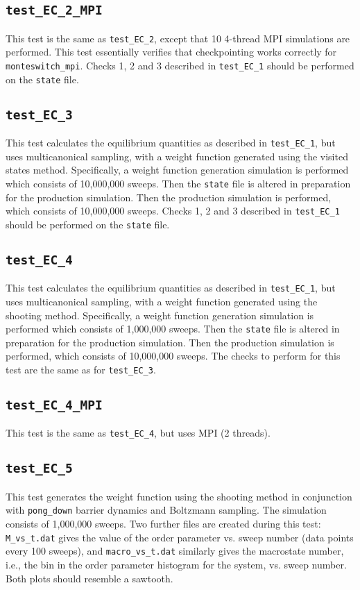 \documentclass{report}
\begin{document}
\subsection{\texttt{test\_EC\_2\_MPI}}
This test is the same as \texttt{test\_EC\_2}, except that 10 4-thread MPI simulations are performed. This test essentially verifies 
that checkpointing works correctly for \texttt{monteswitch\_mpi}. Checks 1, 2 and 3 described in \texttt{test\_EC\_1} should be 
performed on the \texttt{state} file.


\subsection{\texttt{test\_EC\_3}}
This test calculates the equilibrium quantities as described in \texttt{test\_EC\_1}, but uses multicanonical sampling,
with a weight function generated using the visited states method. Specifically, a weight function generation 
simulation is performed which consists of 10,000,000 sweeps. Then the \texttt{state} file is altered in preparation 
for the production simulation. Then the production simulation is performed, which consists of 10,000,000 sweeps.
Checks 1, 2 and 3 described in \texttt{test\_EC\_1} should be performed on the \texttt{state} file.


\subsection{\texttt{test\_EC\_4}}
This test calculates the equilibrium quantities as described in \texttt{test\_EC\_1}, but uses multicanonical sampling,
with a weight function generated using the shooting method. Specifically, a weight function generation simulation
is performed which consists of 1,000,000 sweeps. Then the \texttt{state} file is altered in preparation 
for the production simulation. Then the production simulation is performed, which consists of 10,000,000 sweeps.
The checks to perform for this test are the same as for \texttt{test\_EC\_3}.


\subsection{\texttt{test\_EC\_4\_MPI}}
This test is the same as \texttt{test\_EC\_4}, but uses MPI (2 threads).


\subsection{\texttt{test\_EC\_5}}
This test generates the weight function using the shooting method in conjunction with \texttt{pong\_down} barrier
dynamics and Boltzmann sampling. The simulation consists of 1,000,000 sweeps. Two further files are created 
during this test: \texttt{M\_vs\_t.dat} gives the value of the order parameter vs. sweep number (data points 
every 100 sweeps), and \texttt{macro\_vs\_t.dat} similarly gives the macrostate number, i.e., the bin in the 
order parameter histogram for the system, vs. sweep number. Both plots should resemble a sawtooth.
\end{document}
